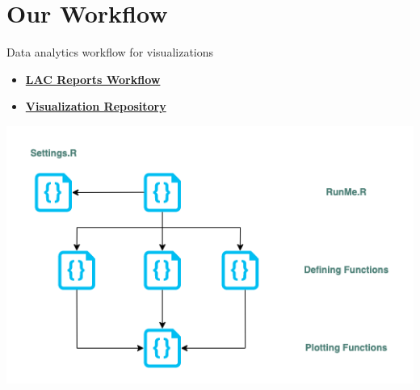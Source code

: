 \documentclass[
  ignorenonframetext,
]{beamer}
\providecommand{\tightlist}{%
  \setlength{\itemsep}{0pt}\setlength{\parskip}{0pt}}\usepackage{longtable,booktabs,array}
\begin{document}
\hypertarget{our-workflow}{%
\section{Our Workflow}\label{our-workflow}}

\begin{frame}{Data analytics workflow for visualizations}
\protect\hypertarget{data-analytics-workflow-for-visualizations}{}
\begin{itemize}
\tightlist
\item
  \href{https://github.com/ctoruno/LAC-Reports}{\textbf{LAC Reports
  Workflow}}
\item
  \href{https://github.com/ctoruno/WJP-Data-Viz}{\textbf{Visualization
  Repository}}
\end{itemize}

\includegraphics{media/code_structure.png}
\end{frame}
\end{document}
